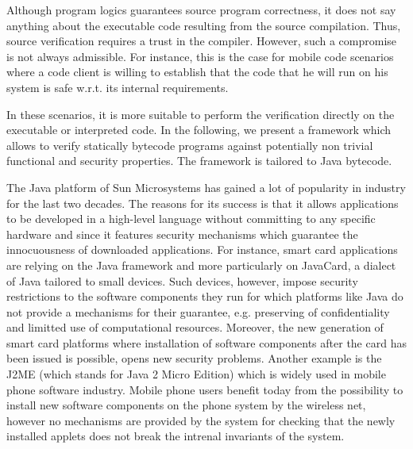 Although  program logics  guarantees source program correctness, it does not say anything about the executable code
resulting from the source compilation. Thus, source verification requires a  trust in the compiler.
However,  such a compromise is not always admissible. For instance, this is the case for mobile code scenarios where a code client is
 willing to establish that the code that he will run on his system is safe w.r.t. its internal requirements. 
    
In these scenarios, it is more suitable to perform the verification  directly on the  executable or interpreted code.
In the following, we present a framework which allows to verify statically bytecode programs 
against potentially non trivial functional and security properties. The framework is tailored to Java bytecode.

 The Java platform  of Sun Microsystems has gained a lot of popularity in industry  for the last two decades.
 The reasons for its  success is that it allows applications to 
 be developed in a high-level language without committing to any
 specific hardware and since it features security mechanisms which
 guarantee the innocuousness of downloaded applications. 
 For instance, smart card applications are relying on the Java framework and
 more particularly on JavaCard, a dialect of Java tailored to small devices.
 Such devices, however, impose  security restrictions  to the software components  they run for which platforms like Java do not provide 
 a mechanisms for their guarantee, e.g. preserving of confidentiality and limitted use of computational resources. Moreover,
 the new generation of smart card platforms where installation of  software components after the card has been issued is possible, opens new security problems.
 Another example is the J2ME (which stands for Java 2 Micro Edition) which is widely used in mobile phone software industry.
 Mobile phone users benefit today from the possibility to install new software components on the phone system by the wireless net, however no mechanisms are provided by the system 
 for checking that the newly installed applets does not break the intrenal invariants of the system.


